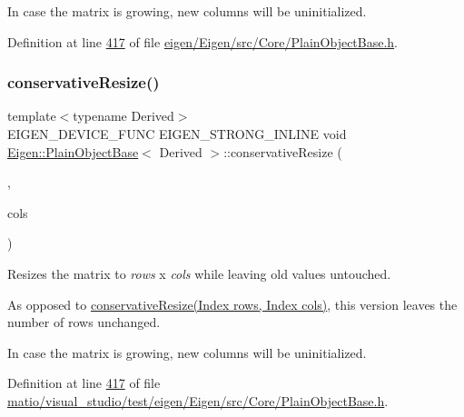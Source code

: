 In case the matrix is growing, new columns will be uninitialized. 

Definition at line \hyperlink{eigen_2_eigen_2src_2_core_2_plain_object_base_8h_source_l00417}{417} of file \hyperlink{eigen_2_eigen_2src_2_core_2_plain_object_base_8h_source}{eigen/\+Eigen/src/\+Core/\+Plain\+Object\+Base.\+h}.

\mbox{\label{class_eigen_1_1_plain_object_base_a46afa73816539b0fe36c6e9abd7978a6}} 
\subsubsection{\texorpdfstring{conservative\+Resize()}{conservativeResize()}\hspace{0.1cm}{\footnotesize\ttfamily [6/8]}}
{\footnotesize\ttfamily template$<$typename Derived$>$ \\
E\+I\+G\+E\+N\+\_\+\+D\+E\+V\+I\+C\+E\+\_\+\+F\+U\+NC E\+I\+G\+E\+N\+\_\+\+S\+T\+R\+O\+N\+G\+\_\+\+I\+N\+L\+I\+NE void \hyperlink{class_eigen_1_1_plain_object_base}{Eigen\+::\+Plain\+Object\+Base}$<$ Derived $>$\+::conservative\+Resize (\begin{DoxyParamCaption}\item[{No\+Change\+\_\+t}]{,  }\item[{\hyperlink{namespace_eigen_a62e77e0933482dafde8fe197d9a2cfde}{Index}}]{cols }\end{DoxyParamCaption})\hspace{0.3cm}{\ttfamily [inline]}}

Resizes the matrix to {\itshape rows} x {\itshape cols} while leaving old values untouched.

As opposed to \hyperlink{class_eigen_1_1_plain_object_base_a5e06c62950ba98fe8ba9c7d4be9c19e4}{conservative\+Resize(\+Index rows, Index cols)}, this version leaves the number of rows unchanged.

In case the matrix is growing, new columns will be uninitialized. 

Definition at line \hyperlink{matio_2visual__studio_2test_2eigen_2_eigen_2src_2_core_2_plain_object_base_8h_source_l00417}{417} of file \hyperlink{matio_2visual__studio_2test_2eigen_2_eigen_2src_2_core_2_plain_object_base_8h_source}{matio/visual\+\_\+studio/test/eigen/\+Eigen/src/\+Core/\+Plain\+Object\+Base.\+h}.

